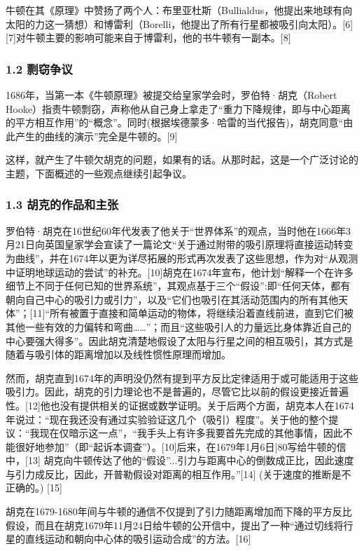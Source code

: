 牛顿在其《原理》中赞扬了两个人：布里亚杜斯（Bullialdus，他提出来地球有向太阳的力这一猜想）和博雷利（Borelli，他提出了所有行星都被吸引向太阳）。[6][7]对牛顿主要的影响可能来自于博雷利，他的书牛顿有一副本。[8]

\subsubsection{1.2 剽窃争议}

1686年，当第一本《牛顿原理》被提交给皇家学会时，罗伯特·胡克（Robert Hooke）指责牛顿剽窃，声称他从自己身上拿走了“重力下降规律，即与中心距离的平方相互作用”的“概念”。同时(根据埃德蒙多·哈雷的当代报告)，胡克同意“由此产生的曲线的演示”完全是牛顿的。[9]

这样，就产生了牛顿欠胡克的问题，如果有的话。从那时起，这是一个广泛讨论的主题，下面概述的一些观点继续引起争议。

\subsubsection{1.3 胡克的作品和主张}

罗伯特·胡克在16世纪60年代发表了他关于“世界体系”的观点，当时他在1666年3月21日向英国皇家学会宣读了一篇论文“关于通过附带的吸引原理将直接运动转变为曲线”，并在1674年以更为详尽拓展的形式再次发表了这些思想，作为对“从观测中证明地球运动的尝试”的补充。[10]胡克在1674年宣布，他计划“解释一个在许多细节上不同于任何已知的世界系统”，其观点基于三个“假设”:即“任何天体，都有朝向自己中心的吸引力或引力”，以及“它们也吸引在其活动范围内的所有其他天体”；[11]“所有被置于直接和简单运动的物体，将继续沿着直线前进，直到它们被其他一些有效的力偏转和弯曲……”；而且“这些吸引人的力量远比身体靠近自己的中心要强大得多”。因此胡克清楚地假设了太阳与行星之间的相互吸引，其方式是随着与吸引体的距离增加以及线性惯性原理而增加。

然而，胡克直到1674年的声明没仍然有提到平方反比定律适用于或可能适用于这些吸引力。因此，胡克的引力理论也不是普遍的，尽管它比以前的假设更接近普遍性。[12]他也没有提供相关的证据或数学证明。关于后两个方面，胡克本人在1674年说过：“现在我还没有通过实验验证这几个（吸引）程度”。关于他的整个提议：“我现在仅暗示这一点”，“我手头上有许多我要首先完成的其他事情，因此不能很好地参加”（即“起诉本调查”）。[10]后来，在1679年1月6日|80写给牛顿的信中，[13] 胡克向牛顿传达了他的“假设”...引力与距离中心的倒数成正比，因此速度与引力成反比，因此，开普勒假设对距离的相互作用。”[14] (关于速度的推断是不正确的。) [15]

胡克在1679-1680年间与牛顿的通信不仅提到了引力随距离增加而下降的平方反比假设，而且在胡克1679年11月24日给牛顿的公开信中，提出了一种“通过切线将行星的直线运动和朝向中心体的吸引运动合成”的方法。[16]

